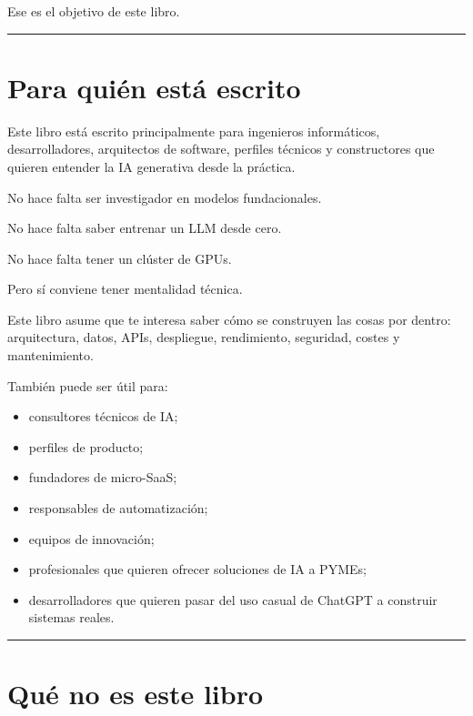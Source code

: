 Ese es el objetivo de este libro.

\begin{center}\rule{0.5\linewidth}{0.5pt}\end{center}

\section{Para quién está escrito}\label{para-quiuxe9n-estuxe1-escrito}

Este libro está escrito principalmente para ingenieros informáticos,
desarrolladores, arquitectos de software, perfiles técnicos y
constructores que quieren entender la IA generativa desde la práctica.

No hace falta ser investigador en modelos fundacionales.

No hace falta saber entrenar un LLM desde cero.

No hace falta tener un clúster de GPUs.

Pero sí conviene tener mentalidad técnica.

Este libro asume que te interesa saber cómo se construyen las cosas por
dentro: arquitectura, datos, APIs, despliegue, rendimiento, seguridad,
costes y mantenimiento.

También puede ser útil para:

\begin{itemize}
\tightlist
\item
  consultores técnicos de IA;
\item
  perfiles de producto;
\item
  fundadores de micro-SaaS;
\item
  responsables de automatización;
\item
  equipos de innovación;
\item
  profesionales que quieren ofrecer soluciones de IA a PYMEs;
\item
  desarrolladores que quieren pasar del uso casual de ChatGPT a
  construir sistemas reales.
\end{itemize}

\begin{center}\rule{0.5\linewidth}{0.5pt}\end{center}

\section{Qué no es este libro}\label{quuxe9-no-es-este-libro}

